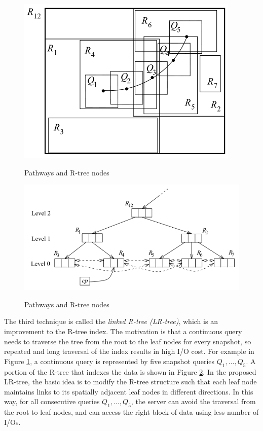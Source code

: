 \documentclass[paper=a4, fontsize=18pt]{article} %
\numberwithin{equation}{section} %
\numberwithin{figure}{section} %
\numberwithin{table}{section} %
\begin{document}
\begin{figure}[h]
  \centering
  \includegraphics[width=.5\linewidth]{8_29_3D_pathway.png}\\
  \caption{Pathways and R-tree nodes}\label{fig:3D_pathway}
\end{figure}

\begin{figure}[h]
  \centering
  \includegraphics[width=.7\linewidth]{8_29_3D_LR.png}\\
  \caption{Pathways and R-tree nodes}\label{fig:3D_LR}
\end{figure}

The third technique is called the \emph{linked R-tree (LR-tree)}, which is an improvement to the R-tree  index. The motivation is that a continuous query needs to traverse the tree from the root to the leaf nodes for every snapshot, so repeated and long traversal of the index results in high I/O cost. For example in Figure \ref{fig:3D_pathway}, a continuous query is represented by five snapshot queries $Q_1,...,Q_5$. A portion of the R-tree that indexes the data is shown in Figure \ref{fig:3D_LR}. In the proposed LR-tree, the basic idea is to modify the R-tree structure such that each leaf node maintains links to its spatially adjacent leaf nodes in different directions. In this way, for all consecutive queries $Q_1,...,Q_5$, the server can avoid the traversal from the root to leaf nodes, and can access the right block of data using less number of I/Os.
\end{document}

